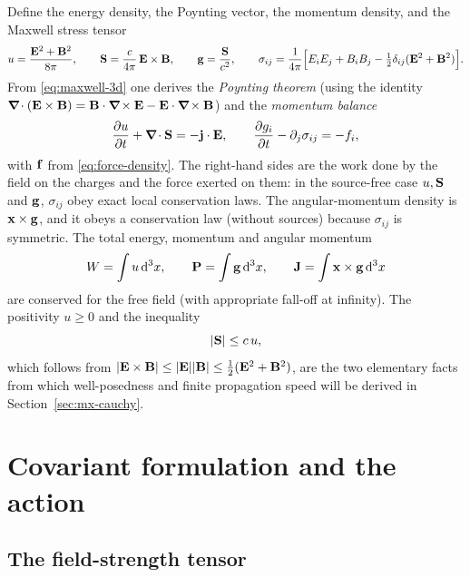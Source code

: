 Define the energy density, the Poynting vector, the momentum density, and
the Maxwell stress tensor
\begin{equation}\label{eq:densities}
u=\frac{\mathbf{E}^2+\mathbf{B}^2}{8\pi},\qquad
\mathbf{S}=\frac{c}{4\pi}\,\mathbf{E}\times\mathbf{B},\qquad
\mathbf{g}=\frac{\mathbf{S}}{c^2},\qquad
\sigma_{ij}=\frac1{4\pi}\Big[E_iE_j+B_iB_j-\tfrac12\delta_{ij}(\mathbf{E}^2+\mathbf{B}^2)\Big].
\end{equation}
From \eqref{eq:maxwell-3d} one derives the \emph{Poynting theorem} (using the identity
$\boldsymbol{\nabla}\!\cdot(\mathbf{E}\times\mathbf{B})=\mathbf{B}\cdot\boldsymbol{\nabla}\!\times\mathbf{E}-\mathbf{E}\cdot\boldsymbol{\nabla}\!\times\mathbf{B}$) and the
\emph{momentum balance}
\begin{equation}\label{eq:poynting}
\frac{\partial u}{\partial t}+\boldsymbol{\nabla}\!\cdot\mathbf{S}=-\mathbf{j}\cdot\mathbf{E},\qquad
\frac{\partial g_i}{\partial t}-\partial_j\sigma_{ij}=-f_i ,
\end{equation}
with $\mathbf{f}$ from \eqref{eq:force-density}.  The right-hand sides are the
work done by the field on the charges and the force exerted on them: in
the source-free case $u,\mathbf{S}$ and $\mathbf{g}$, $\sigma_{ij}$ obey exact local
conservation laws.  The angular-momentum density is $\mathbf{x}\times\mathbf{g}$, and
it obeys a conservation law (without sources) because $\sigma_{ij}$ is
symmetric.  The total energy, momentum and angular momentum
\begin{equation}
W=\int u\,\mathrm{d}^3x,\qquad \mathbf P=\int\mathbf{g}\,\mathrm{d}^3x,\qquad
\mathbf J=\int \mathbf{x}\times\mathbf{g}\,\mathrm{d}^3x
\end{equation}
are conserved for the free field (with appropriate fall-off at infinity).
The positivity $u\ge0$ and the inequality
\begin{equation}\label{eq:S-bound}
|\mathbf{S}|\le c\,u ,
\end{equation}
which follows from $|\mathbf{E}\times\mathbf{B}|\le|\mathbf{E}||\mathbf{B}|\le\tfrac12(\mathbf{E}^2+\mathbf{B}^2)$,
are the two elementary facts from which well-posedness and finite
propagation speed will be derived in Section~\ref{sec:mx-cauchy}.

\section{Covariant formulation and the action}\label{sec:mx-cov}

\subsection{The field-strength tensor}

